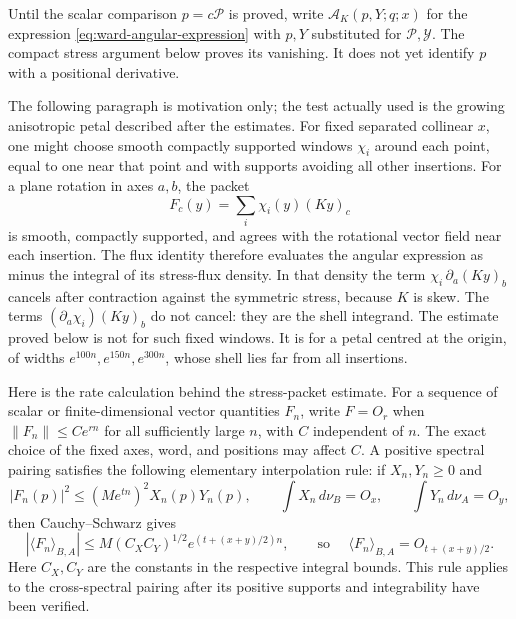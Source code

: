 Until the scalar comparison $p=c\mathcal P$ is proved, write
$\mathcal A_K(p,Y;q;x)$ for the expression
\eqref{eq:ward-angular-expression} with $p,Y$ substituted for
$\mathcal P,\mathcal Y$. The compact stress argument below proves its
vanishing. It does not yet identify $p$ with a positional derivative.

The following paragraph is motivation only; the test actually used is the
growing anisotropic petal described after the estimates.  For fixed
separated collinear $x$, one might choose smooth compactly supported
windows $\chi_i$ around each point, equal to one near that point and with
supports avoiding all other insertions.  For a plane rotation in axes
$a,b$, the packet
\[
 F_c(y)=\sum_i\chi_i(y)(K y)_c
\]
is smooth, compactly supported, and agrees with the rotational vector
field near each insertion.  The flux identity therefore evaluates the
angular expression as minus the integral of its stress-flux density.  In
that density the term $\chi_i\,\partial_a(Ky)_b$ cancels after contraction
against the symmetric stress, because $K$ is skew.  The terms
$(\partial_a\chi_i)(Ky)_b$ do not cancel: they are the shell integrand.
The estimate proved below is not for such fixed windows.  It is for a petal
centred at the origin, of widths $e^{100n},e^{150n},e^{300n}$, whose shell
lies far from all insertions.

Here is the rate calculation behind the stress-packet estimate.  For a
sequence of scalar or finite-dimensional vector quantities $F_n$, write
$F=O_r$ when $\|F_n\|\leq C e^{rn}$ for all sufficiently large $n$, with
$C$ independent of $n$.  The exact choice of the fixed axes, word, and
positions may affect $C$.  A positive spectral pairing satisfies the
following elementary interpolation rule: if $X_n,Y_n\geq0$ and
\[
 |F_n(p)|^2\leq (M e^{tn})^2X_n(p)Y_n(p),\qquad
 \int X_n\,d\nu_B=O_x,\qquad \int Y_n\,d\nu_A=O_y,
\]
then Cauchy--Schwarz gives
\begin{equation}
 |\langle F_n\rangle_{B,A}|
 \leq M(C_XC_Y)^{1/2}e^{(t+(x+y)/2)n},
 \qquad\text{so }\quad
 \langle F_n\rangle_{B,A}=O_{t+(x+y)/2}.
\label{eq:ward-balanced-price}
\end{equation}
Here $C_X,C_Y$ are the constants in the respective integral bounds.  This
rule applies to the cross-spectral pairing after its positive supports
and integrability have been verified.

